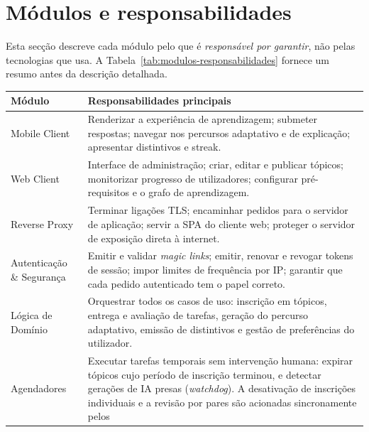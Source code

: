 \section{M\'odulos e responsabilidades}
\label{sec:modulos}

Esta sec\c{c}\~ao descreve cada m\'odulo pelo que \'e \emph{respons\'avel por
garantir}, n\~ao pelas tecnologias que usa. A Tabela~\ref{tab:modulos-responsabilidades}
fornece um resumo antes da descri\c{c}\~ao detalhada.

\begin{table}[htbp]
	\centering
	\small
	\begin{tabular}{p{3.0cm} p{9.5cm}}
		\toprule
		\textbf{M\'odulo} & \textbf{Responsabilidades principais} \\
		\midrule
		Mobile Client
			& Renderizar a experi\^encia de aprendizagem; submeter respostas; navegar
			  nos percursos adaptativo e de explica\c{c}\~ao; apresentar distintivos e streak. \\
		\addlinespace
		Web Client
			& Interface de administra\c{c}\~ao; criar, editar e publicar t\'opicos; monitorizar
			  progresso de utilizadores; configurar pr\'e-requisitos e o grafo de
			  aprendizagem. \\
		\addlinespace
		Reverse Proxy
			& Terminar liga\c{c}\~oes TLS; encaminhar pedidos para o servidor de aplica\c{c}\~ao;
			  servir a SPA do cliente web; proteger o servidor de exposi\c{c}\~ao direta
			  \`a internet. \\
		\addlinespace
		Autentica\c{c}\~ao \& Seguran\c{c}a
			& Emitir e validar \emph{magic links}; emitir, renovar e revogar tokens
			  de sess\~ao; impor limites de frequ\^encia por IP; garantir que cada pedido
			  autenticado tem o papel correto. \\
		\addlinespace
		L\'ogica de Dom\'inio
			& Orquestrar todos os casos de uso: inscri\c{c}\~ao em t\'opicos,
			  entrega e avalia\c{c}\~ao de tarefas, gera\c{c}\~ao do percurso adaptativo,
			  emiss\~ao de distintivos e gest\~ao de prefer\^encias do utilizador. \\
		\addlinespace
		Agendadores
			& Executar tarefas temporais sem interven\c{c}\~ao humana: expirar t\'opicos
			  cujo per\'iodo de inscri\c{c}\~ao terminou, e detectar gera\c{c}\~oes
			  de IA presas (\emph{watchdog}). A desativa\c{c}\~ao de inscri\c{c}\~oes
			  individuais e a revis\~ao por pares s\~ao acionadas sincronamente pelos

\end{tabular}
\end{table}
